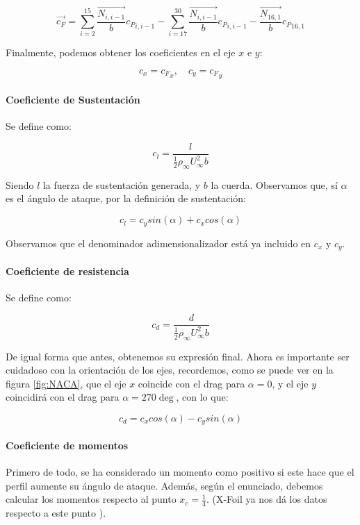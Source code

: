 \documentclass{article}
\begin{document}
$$\vec{c_F} = \sum_{i = 2}^{15} \frac{\vec{N_{i, i-1}}}{b} {c_P}_{i, i-1} - 
\sum_{i=17}^{30} \frac{\vec{N_{i, i-1}}}{b} {c_P}_{i, i-1} -
\frac{\vec{N_{16, 1}}}{b} {c_P}_{16, 1} $$

Finalmente, podemos obtener los coeficientes en el eje $x$ e $y$:

$$c_x = {c_F}_x, \quad c_y = {c_F}_y$$

\paragraph{Coeficiente de Sustentación}

Se define como:

$$c_l = \frac{l}{\frac{1}{2} \rho_{\infty} U_{\infty}^2 b}$$

Siendo $l$ la fuerza de sustentación generada, y $b$ la cuerda. Observamos que, sí $\alpha$ es el ángulo de ataque, por la 
definición de sustentación:

$$c_l = c_y sin(\alpha) + c_x cos(\alpha)$$

Observamos que el denominador adimensionalizador está ya incluido en $c_x$ y $c_y$. 

\paragraph{Coeficiente de resistencia}

Se define como:

$$c_d = \frac{d}{\frac{1}{2} \rho_{\infty} U_{\infty}^2 b}$$

De igual forma que antes, obtenemos su expresión final. Ahora es importante ser cuidadoso con la orientación de los ejes,
recordemos, como se puede ver en la figura \ref{fig:NACA}, que el eje $x$ coincide con el drag para $\alpha=0$, y
el eje $y$ coincidirá con el drag para $\alpha=270\deg$, con lo que:

$$c_d = c_x cos(\alpha) - c_y sin(\alpha)$$

\paragraph{Coeficiente de momentos}

Primero de todo, se ha considerado un momento como positivo si este hace que el perfil aumente su ángulo de ataque.
Además, según el enunciado, debemos calcular los momentos respecto al punto $x_c = \frac{1}{4}$. (X-Foil ya nos dá 
los datos respecto a este punto \cite{xfoil}).
\end{document}
